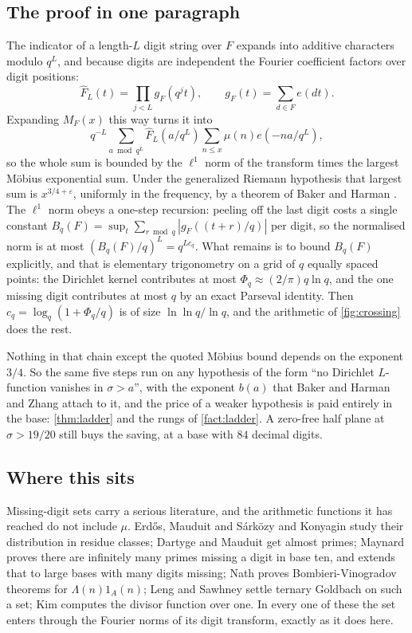 \documentclass[11pt]{amsart}
\theoremstyle{definition}
\theoremstyle{remark}
\begin{document}
\subsection*{The proof in one paragraph}

The indicator of a length-$L$ digit string over $F$ expands into additive characters modulo $q^L$, and because digits are independent the Fourier coefficient factors over digit positions:
\[
  \widehat F_L(t) = \prod_{j < L} g_F(q^j t), \qquad g_F(t) = \sum_{d \in F} e(dt).
\]
Expanding $M_F(x)$ this way turns it into
\[
  q^{-L} \sum_{a \bmod q^L} \widehat F_L(a/q^L) \sum_{n \le x} \mu(n) e(-na/q^L),
\]
so the whole sum is bounded by the $\ell^1$ norm of the transform times the largest M\"obius exponential sum. Under the generalized Riemann hypothesis that largest sum is $x^{3/4+\varepsilon}$, uniformly in the frequency, by a theorem of Baker and Harman \cite{bh}. The $\ell^1$ norm obeys a one-step recursion: peeling off the last digit costs a single constant $B_q(F) = \sup_t \sum_{r \bmod q} |g_F((t+r)/q)|$ per digit, so the normalised norm is at most $(B_q(F)/q)^L = q^{L c_q}$. What remains is to bound $B_q(F)$ explicitly, and that is elementary trigonometry on a grid of $q$ equally spaced points: the Dirichlet kernel contributes at most $\Phi_q \approx (2/\pi) q \ln q$, and the one missing digit contributes at most $q$ by an exact Parseval identity. Then $c_q = \log_q(1 + \Phi_q/q)$ is of size $\ln\ln q/\ln q$, and the arithmetic of \cref{fig:crossing} does the rest.

Nothing in that chain except the quoted M\"obius bound depends on the exponent $3/4$. So the same five steps run on any hypothesis of the form ``no Dirichlet $L$-function vanishes in $\sigma > a$'', with the exponent $b(a)$ that Baker and Harman \cite{bh} and Zhang \cite{zhang} attach to it, and the price of a weaker hypothesis is paid entirely in the base: \cref{thm:ladder} and the rungs of \cref{fact:ladder}. A zero-free half plane at $\sigma > 19/20$ still buys the saving, at a base with $84$ decimal digits.

\subsection*{Where this sits}

Missing-digit sets carry a serious literature, and the arithmetic functions it has reached do not include $\mu$. Erd\H{o}s, Mauduit and S\'ark\"ozy \cite{ems} and Konyagin \cite{konyagin} study their distribution in residue classes; Dartyge and Mauduit \cite{dm} get almost primes; Maynard \cite{maynard19} proves there are infinitely many primes missing a digit in base ten, and \cite{maynard22} extends that to large bases with many digits missing; Nath \cite{nath} proves Bombieri-Vinogradov theorems for $\Lambda(n) 1_A(n)$; Leng and Sawhney \cite{ls} settle ternary Goldbach on such a set; Kim \cite{kim} computes the divisor function over one. In every one of these the set enters through the Fourier norms of its digit transform, exactly as it does here.
\end{document}
